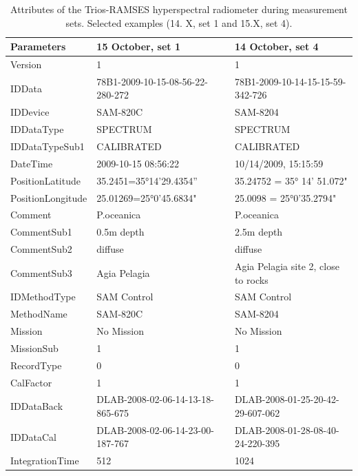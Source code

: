 \documentclass[10pt, a4paper]{article}
\begin{document}
\begin{appendices}
\begin{table}[H]
	\caption{Attributes of the Trios-RAMSES hyperspectral radiometer during measurement sets. Selected examples (14. X, set 1 and 15.X, set 4).}\label{tab:A.1}
	\centering
	  \begin{tabular}{| p{3cm} | p{3cm} | p{5cm} |}
		\hline
		    \textbf{Parameters} & \textbf{15 October, set 1} & \textbf{14 October, set 4} \\ \hline \hline
		     Version &1 & 1 \\ \hline
		     IDData & 78B1-2009-10-15-08-56-22-280-272 & 78B1-2009-10-14-15-15-59-342-726 \\ \hline
		     IDDevice & SAM-820C & SAM-8204\\ \hline
		     IDDataType & SPECTRUM & SPECTRUM \\ \hline
		     IDDataTypeSub1 & CALIBRATED & CALIBRATED \\ \hline
		     DateTime & 2009-10-15 08:56:22 & 10/14/2009, 15:15:59 \\ \hline
		     PositionLatitude & 35.2451=35°14'29.4354” & 35.24752 = 35° 14' 51.072" \\ \hline
		     PositionLongitude & 25.01269=25°0'45.6834" & 25.0098 = 25°0'35.2794" \\ \hline
		     Comment & P.oceanica & P.oceanica \\ \hline
		     CommentSub1 & 0.5m depth & 2.5m depth \\ \hline
		     CommentSub2 & diffuse & diffuse \\ \hline
		     CommentSub3 & Agia Pelagia & Agia Pelagia site 2, close to rocks \\ \hline
		     IDMethodType & SAM Control & SAM Control \\ \hline
		    MethodName & SAM-820C & SAM-8204 \\ \hline
		    Mission & No Mission & No Mission \\ \hline
		    MissionSub & 1 & 1 \\ \hline
		    RecordType & 0 & 0 \\ \hline
		    CalFactor & 1 & 1 \\ \hline
		   IDDataBack & DLAB-2008-02-06-14-13-18-865-675 & DLAB-2008-01-25-20-42-29-607-062 \\ \hline
		   IDDataCal & DLAB-2008-02-06-14-23-00-187-767 & DLAB-2008-01-28-08-40-24-220-395 \\ \hline
		   IntegrationTime & 512 & 1024 \\ \hline

\end{tabular}
\end{table}
\end{appendices}
\end{document}
